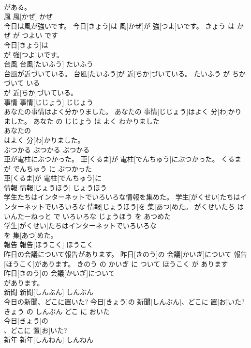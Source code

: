 \documentclass[8pt]{extreport}
\begin{document}
\begin{CJK}{UTF8}{min}
\\	がある。			
\\	風	風[かぜ]	かぜ	
\\	今日は風が強いです。	今日[きょう]は 風[かぜ]が 強[つよ]いです。	きょう は かぜ が つよい です	
\\	今日[きょう]は
\\	が 強[つよ]いです。			
\\	台風	台風[たいふう]	たいふう	
\\	台風が近づいている。	台風[たいふう]が 近[ちか]づいている。	たいふう が ちかづいて いる	
\\	が 近[ちか]づいている。			
\\	事情	事情[じじょう]	じじょう	
\\	あなたの事情はよく分かりました。	あなたの 事情[じじょう]はよく 分[わ]かりました。	あなた の じじょう は よく わかりました	
\\	あなたの
\\	はよく 分[わ]かりました。			
\\	ぶつかる	ぶつかる	ぶつかる	
\\	車が電柱にぶつかった。	車[くるま]が 電柱[でんちゅう]にぶつかった。	くるま が でんちゅう に ぶつかった	
\\	車[くるま]が 電柱[でんちゅう]に
\\	情報	情報[じょうほう]	じょうほう	
\\	学生たちはインターネットでいろいろな情報を集めた。	学生[がくせい]たちはインターネットでいろいろな 情報[じょうほう]を 集[あつ]めた。	がくせいたち は いんたーねっと で いろいろな じょうほう を あつめた	
\\	学生[がくせい]たちはインターネットでいろいろな
\\	を 集[あつ]めた。			
\\	報告	報告[ほうこく]	ほうこく	
\\	昨日の会議について報告があります。	昨日[きのう]の 会議[かいぎ]について 報告[ほうこく]があります。	きのう の かいぎ に ついて ほうこく が あります	
\\	昨日[きのう]の 会議[かいぎ]について
\\	があります。			
\\	新聞	新聞[しんぶん]	しんぶん	
\\	今日の新聞、どこに置いた?	今日[きょう]の 新聞[しんぶん]、どこに 置[お]いた?	きょう の しんぶん どこ に おいた	
\\	今日[きょう]の
\\	、どこに 置[お]いた?			
\\	新年	新年[しんねん]	しんねん	

\end{CJK}
\end{document}
